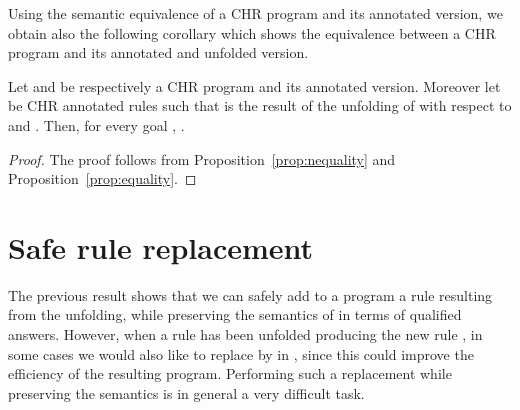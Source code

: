 \documentclass{tlp}
\begin{document}
Using the semantic equivalence of a CHR program and its annotated
version, we obtain  also the following corollary which shows the equivalence between a CHR program
and its annotated and unfolded version.

\begin{corollary}\label{prop:QAunf}
Let  and  be respectively a CHR program and its annotated version.
Moreover let  be CHR annotated rules such that
  is the result
of the unfolding of  with respect to  and .
Then, for every goal ,
.
\end{corollary}
\begin{proof}
The proof follows from
Proposition~\ref{prop:nequality}
and Proposition~\ref{prop:equality}.
\end{proof}




\section{Safe rule replacement}\label{sec:safty-rule-deletion}

The previous result shows that we can safely add to
a program  a rule resulting from the unfolding, while preserving the
semantics of  in terms of qualified answers.
However, when a rule  has been unfolded producing
the new rule , in some cases we would also like to replace  by  in ,
since this could improve the efficiency of the resulting program.
Performing such a replacement while preserving the semantics
is in general a very difficult task.
\end{document}
